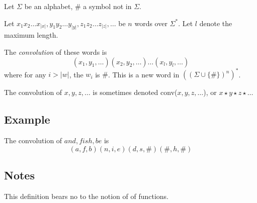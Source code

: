 \documentclass[12pt]{article}
\begin{document}
Let $\Sigma$ be an alphabet, $\#$ a symbol not in $\Sigma$.

Let $x_1x_2\ldots x_{|x|},y_1y_2\ldots y_{|y|},z_1z_2\ldots z_{|z|},\ldots$ be $n$ words over $\Sigma^*$.  Let $l$ denote the maximum length.

The \emph{convolution} of these words is
$$(x_1,y_1,\ldots)(x_2,y_2,\ldots)\ldots(x_l,y_l,\ldots)$$where for any  $i>|w|$, the $w_i$ is $\#$.  This is a new word in $((\Sigma\cup\{\#\})^n)^*$.

The convolution of $x,y,z,\ldots$ is sometimes denoted conv($x,y,z,\ldots$), or $x\star y\star z\star\ldots$

\subsection*{Example}

The convolution of $and, fish, be$ is
$$(a,f,b)(n,i,e)(d,s,\#)(\#,h,\#)$$

\subsection*{Notes}
This definition bears no  to the notion of  of functions.
\end{document}
